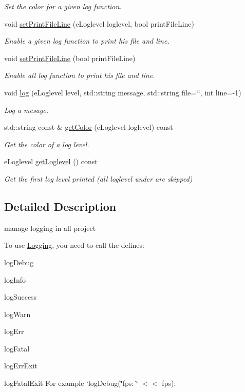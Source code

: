 \begin{DoxyCompactItemize}
\begin{DoxyCompactList}\small\item\em Set the color for a given log function. \end{DoxyCompactList}\item 
void \hyperlink{class_logging_a3562c02cd1399d5a2a4c3d74fcabd297}{set\+Print\+File\+Line} (e\+Loglevel loglevel, bool print\+File\+Line)
\begin{DoxyCompactList}\small\item\em Enable a given log function to print his file and line. \end{DoxyCompactList}\item 
void \hyperlink{class_logging_ac1d4bfabbd4cc805c22bf080441a912a}{set\+Print\+File\+Line} (bool print\+File\+Line)
\begin{DoxyCompactList}\small\item\em Enable all log function to print his file and line. \end{DoxyCompactList}\item 
void \hyperlink{class_logging_af5b442a39ab4625efe1473b92e09f677}{log} (e\+Loglevel level, std\+::string message, std\+::string file=\char`\"{}\char`\"{}, int line=-\/1)
\begin{DoxyCompactList}\small\item\em Log a mesage. \end{DoxyCompactList}\item 
std\+::string const  \& \hyperlink{class_logging_ab6b777cad3125e46c087e439e8d42e04}{get\+Color} (e\+Loglevel loglevel) const
\begin{DoxyCompactList}\small\item\em Get the color of a log level. \end{DoxyCompactList}\item 
e\+Loglevel \hyperlink{class_logging_a79047102294c8446fb8ec27e95835e52}{get\+Loglevel} () const
\begin{DoxyCompactList}\small\item\em Get the first log level printed (all loglevel under are skipped) \end{DoxyCompactList}\end{DoxyCompactItemize}


\subsection{Detailed Description}
manage logging in all project 

To use \hyperlink{class_logging}{Logging}, you need to call the defines\+:
\begin{DoxyItemize}
\item log\+Debug
\item log\+Info
\item log\+Success
\item log\+Warn
\item log\+Err
\item log\+Fatal
\item log\+Err\+Exit
\item log\+Fatal\+Exit For example `log\+Debug(\char`\"{}fps\+: \char`\"{} $<$$<$ fps); 
\end{DoxyItemize}

